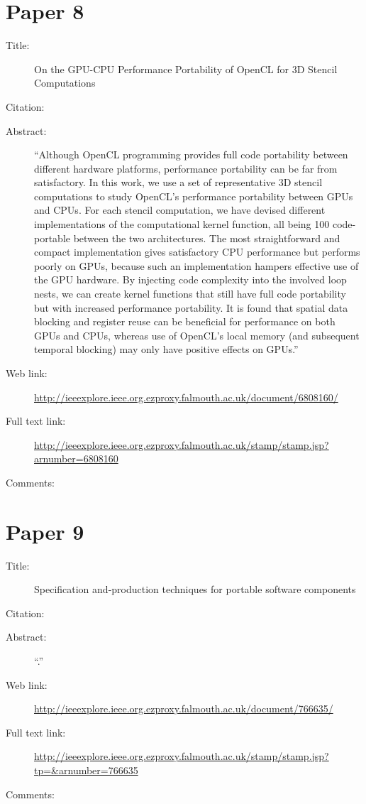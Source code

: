 \documentclass{scrartcl}
\begin{document}
\section*{Paper 8}
\begin{description}
\item[Title:] On the GPU-CPU Performance Portability of OpenCL for 3D Stencil Computations
\item[Citation:] \cite{Su}
\item[Abstract:] ``Although OpenCL programming provides full code portability between different hardware platforms, performance portability can be far from satisfactory. In this work, we use a set of representative 3D stencil computations to study OpenCL's performance portability between GPUs and CPUs. For each stencil computation, we have devised different implementations of the computational kernel function, all being 100 code-portable between the two architectures. The most straightforward and compact implementation gives satisfactory CPU performance but performs poorly on GPUs, because such an implementation hampers effective use of the GPU hardware. By injecting code complexity into the involved loop nests, we can create kernel functions that still have full code portability but with increased performance portability. It is found that spatial data blocking and register reuse can be beneficial for performance on both GPUs and CPUs, whereas use of OpenCL's local memory (and subsequent temporal blocking) may only have positive effects on GPUs.''
\item[Web link:] \url{http://ieeexplore.ieee.org.ezproxy.falmouth.ac.uk/document/6808160/}
\item[Full text link:]  \url{http://ieeexplore.ieee.org.ezproxy.falmouth.ac.uk/stamp/stamp.jsp?arnumber=6808160}
\item[Comments:]
\end{description}

\section*{Paper 9}
\begin{description}
\item[Title:] Specification and-production techniques for portable software components
\item[Citation:] \cite{Hardy}
\item[Abstract:] ``.''
\item[Web link:] \url{http://ieeexplore.ieee.org.ezproxy.falmouth.ac.uk/document/766635/}
\item[Full text link:]  \url{http://ieeexplore.ieee.org.ezproxy.falmouth.ac.uk/stamp/stamp.jsp?tp=&arnumber=766635}
\item[Comments:]
\end{description}
\end{document}
